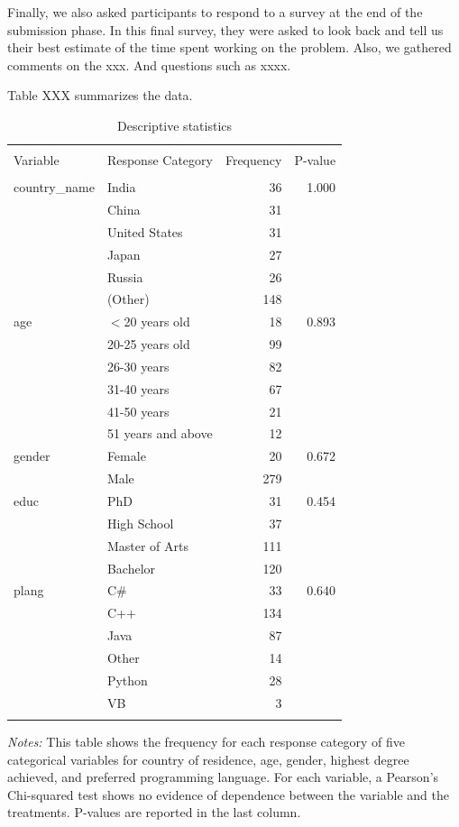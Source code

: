 \documentclass[12pt,]{article}
\theoremstyle{plain} %
\newenvironment{tablenotes}[1][]{
  \begin{minipage}{\textwidth}\emph{Notes:}{\footnotesize #1}
}{\end{minipage}}
\begin{document}
Finally, we also asked participants to respond to a survey at the end of
the submission phase. In this final survey, they were asked to look back
and tell us their best estimate of the time spent working on the
problem. Also, we gathered comments on the xxx. And questions such as
xxxx.

Table XXX summarizes the data.

\begin{table}
\centering
\caption{Descriptive statistics}
\label{tab: desc}
\begin{tabular}{lp{4cm}rr}
  \\[-1.8ex]\hline \hline \\[-1.8ex]
Variable & Response Category & Frequency & P-value \\ 
  \hline \\[-1.86ex]
country\_name & India & 36 & 1.000 \\ 
   & China & 31 &  \\ 
   & United States & 31 &  \\ 
   & Japan & 27 &  \\ 
   & Russia & 26 &  \\ 
   & (Other) & 148 &  \\ 
  age & $<$20 years old & 18 & 0.893 \\ 
   & 20-25 years old & 99 &  \\ 
   & 26-30 years & 82 &  \\ 
   & 31-40 years & 67 &  \\ 
   & 41-50 years & 21 &  \\ 
   & 51 years and above & 12 &  \\ 
  gender & Female & 20 & 0.672 \\ 
   & Male & 279 &  \\ 
  educ & PhD & 31 & 0.454 \\ 
   & High School & 37 &  \\ 
   & Master of Arts & 111 &  \\ 
   & Bachelor & 120 &  \\ 
  plang & C\# & 33 & 0.640 \\ 
   & C++ & 134 &  \\ 
   & Java & 87 &  \\ 
   & Other & 14 &  \\ 
   & Python & 28 &  \\ 
   & VB & 3 &  \\ 
   \hline \\[-1.8ex]
\end{tabular}
\begin{tablenotes}\footnotesize
This table shows the frequency for each response category of five categorical variables for country of residence, age, gender, highest degree achieved, and preferred programming language. For each variable, a Pearson's Chi-squared test shows no evidence of dependence  between the variable and the treatments. P-values are reported in the last column.
\end{tablenotes}
\end{table}
\end{document}
